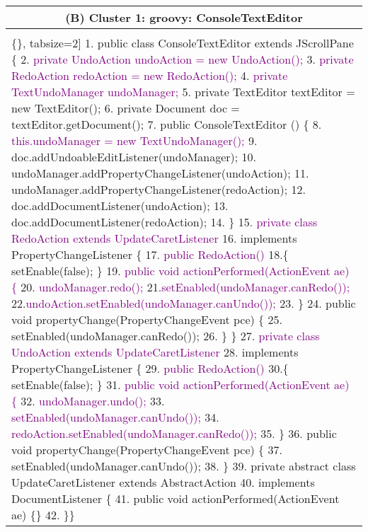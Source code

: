 \begin{figure*}[!htb]
 \begin{minipage}{0.5\textwidth}
\scriptsize 
\begin{tabular}{@{}p{}} 
 \hline 
  \multicolumn{1}{c}{(B) Cluster 1: groovy: ConsoleTextEditor} \\ \hline
  \vspace{-4mm}
\begin{Verbatim}[commandchars=\\\{\}, tabsize=2]
1. public class ConsoleTextEditor extends JScrollPane \{
2. \textcolor{purple}{    private UndoAction undoAction = new UndoAction();}
3. \textcolor{purple}{    private RedoAction redoAction = new RedoAction();}
4. \textcolor{purple}{    private TextUndoManager undoManager;}
5.    private TextEditor textEditor = new TextEditor();
6.    private Document doc = textEditor.getDocument();
7.    public ConsoleTextEditor () \{
8. \textcolor{purple}{     this.undoManager = new TextUndoManager();}
9.      doc.addUndoableEditListener(undoManager);
10.     undoManager.addPropertyChangeListener(undoAction);
11.     undoManager.addPropertyChangeListener(redoAction);
12.     doc.addDocumentListener(undoAction);
13.     doc.addDocumentListener(redoAction);
14.  \}
15.\textcolor{purple}{ private class RedoAction extends UpdateCaretListener}
16.  implements PropertyChangeListener \{
17. \textcolor{purple}{   public RedoAction() }
18.\{     setEnable(false); \}
19.\textcolor{purple}{  public void actionPerformed(ActionEvent ae) \{}
20.\textcolor{purple}{   undoManager.redo();}
21.\textcolor{purple}{setEnabled(undoManager.canRedo());}
22.\textcolor{purple}{undoAction.setEnabled(undoManager.canUndo());}
23.  \}
24.    public void propertyChange(PropertyChangeEvent pce) \{
25.     setEnabled(undoManager.canRedo());
26.   \} \}
27.\textcolor{purple}{ private class UndoAction extends UpdateCaretListener }
28. implements PropertyChangeListener \{
29.\textcolor{purple}{   public RedoAction() }
30.\{     setEnable(false); \}
31.\textcolor{purple}{   public void actionPerformed(ActionEvent ae) \{}
32.\textcolor{purple}{    undoManager.undo();}
33.\textcolor{purple}{    setEnabled(undoManager.canUndo());}
34.\textcolor{purple}{    redoAction.setEnabled(undoManager.canRedo());}
35. \}
36.  public void propertyChange(PropertyChangeEvent pce) \{
37.    setEnabled(undoManager.canUndo());
38.  \}
39.    private abstract class UpdateCaretListener extends AbstractAction
40.     implements DocumentListener \{
41.       public void actionPerformed(ActionEvent ae) \{\}
42.     \}\}
  \end{Verbatim}
      \vspace{-4mm}
     \\ 
\end{tabular} 
\end{minipage}


\end{figure*}
